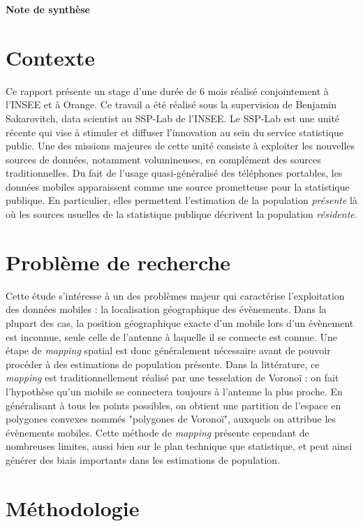 \documentclass[12pt]{article}
\begin{document}
\begin{center}
\LARGE \textbf{Note de synthèse}
\end{center}

\section{Contexte}

Ce rapport présente un stage d'une durée de 6 mois réalisé conjointement à l'INSEE et à Orange. Ce travail a été réalisé sous la supervision de Benjamin Sakarovitch, data scientist au SSP-Lab de l'INSEE. Le SSP-Lab est une unité récente qui vise à stimuler et diffuser l'innovation au sein du service statistique public. Une des missions majeures de cette unité consiste à exploiter les nouvelles sources de données, notamment volumineuses, en complément des sources traditionnelles. Du fait de l'usage quasi-généralisé des téléphones portables, les données mobiles apparaissent comme une source prometteuse pour la statistique publique. En particulier, elles permettent l'estimation de la population \textit{présente} là où les sources usuelles de la statistique publique décrivent la population \textit{résidente}.

\section{Problème de recherche}

Cette étude s'intéresse à un des problèmes majeur qui caractérise l'exploitation des données mobiles : la localisation géographique des évènements. Dans la plupart des cas, la position géographique exacte d'un mobile lors d'un évènement est inconnue, seule celle de l'antenne à laquelle il se connecte est connue. Une étape de \textit{mapping} spatial est donc généralement nécessaire avant de pouvoir procéder à des estimations de population présente. Dans la littérature, ce \textit{mapping} est traditionnellement réalisé par une tesselation de Voronoï : on fait l'hypothèse qu'un mobile se connectera toujours à l'antenne la plus proche. En généralisant à tous les points possibles, on obtient une partition de l'espace en polygones convexes nommés "polygones de Voronoï", auxquels on attribue les évènements mobiles. Cette méthode de \textit{mapping} présente cependant de nombreuses limites, aussi bien sur le plan technique que statistique, et peut ainsi générer des biais importants dans les estimations de population.

\section{Méthodologie}
\end{document}
